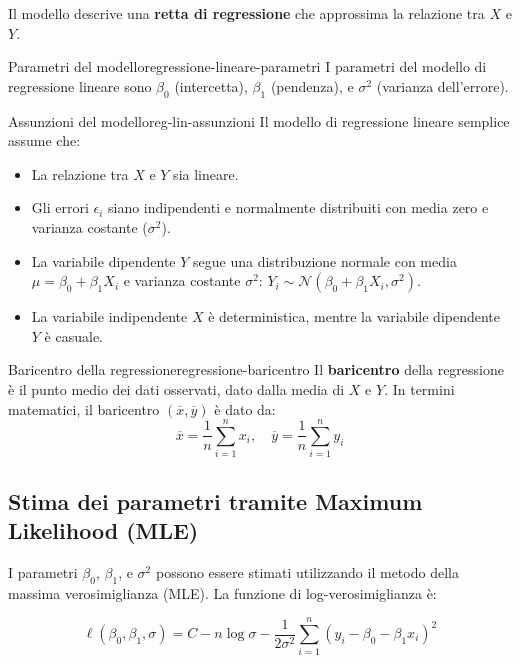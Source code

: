 Il modello descrive una \textbf{retta di regressione} che approssima la relazione tra \( X \) e \( Y \).

\begin{definizione}{Parametri del modello}{regressione-lineare-parametri}
I parametri del modello di regressione lineare sono \( \beta_0 \) (intercetta), \( \beta_1 \) (pendenza), e \( \sigma^2 \) (varianza dell'errore).
\end{definizione}

\begin{nota}{Assunzioni del modello}{reg-lin-assunzioni}
Il modello di regressione lineare semplice assume che:
\begin{itemize}
    \item La relazione tra \( X \) e \( Y \) sia lineare.
    \item Gli errori \( \epsilon_i \) siano indipendenti e normalmente distribuiti con media zero e varianza costante (\( \sigma^2 \)).
    \item La variabile dipendente \( Y \) segue una distribuzione normale con media \( \mu = \beta_0 + \beta_1 X_i \) e varianza costante \( \sigma^2 \): \( Y_i \sim \mathcal{N}(\beta_0 + \beta_1 X_i, \sigma^2) \).
    \item La variabile indipendente \( X \) è deterministica, mentre la variabile dipendente \( Y \) è casuale.
\end{itemize}
\end{nota}

\begin{nota}{Baricentro della regressione}{regressione-baricentro}
Il \textbf{baricentro} della regressione è il punto medio dei dati osservati, dato dalla media di \( X \) e \( Y \). In termini matematici, il baricentro \( (\overline{x}, \overline{y}) \) è dato da:
\[
\overline{x} = \frac{1}{n} \sum_{i=1}^n x_i, \quad \overline{y} = \frac{1}{n} \sum_{i=1}^n y_i
\]
\end{nota}

\subsection{Stima dei parametri tramite Maximum Likelihood (MLE)}

I parametri \( \beta_0 \), \( \beta_1 \), e \( \sigma^2 \) possono essere stimati utilizzando il metodo della massima verosimiglianza (MLE). La funzione di log-verosimiglianza è:

\[
\ell(\beta_0, \beta_1, \sigma) = C - n \log \sigma - \frac{1}{2\sigma^2} \sum_{i=1}^n (y_i - \beta_0 - \beta_1 x_i)^2
\]

